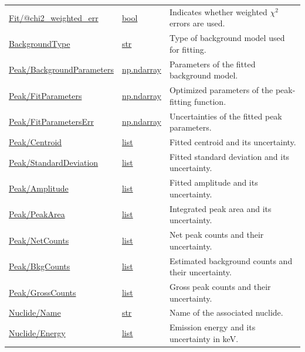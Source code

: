 \begin{table}[H]
\begin{tabular}{p{} p{} p{}}
    \url{Fit/@chi2\_weighted\_err}
        & \url{bool}
        & Indicates whether weighted $\chi^2$ errors are used. \\

    \url{BackgroundType}
        & \url{str}
        & Type of background model used for fitting. \\

    \url{Peak/BackgroundParameters}
        & \url{np.ndarray}
        & Parameters of the fitted background model. \\

    \url{Peak/FitParameters}
        & \url{np.ndarray}
        & Optimized parameters of the peak-fitting function. \\

    \url{Peak/FitParametersErr}
        & \url{np.ndarray}
        & Uncertainties of the fitted peak parameters. \\

    \url{Peak/Centroid}
        & \url{list}
        & Fitted centroid and its uncertainty. \\

    \url{Peak/StandardDeviation}
        & \url{list}
        & Fitted standard deviation and its uncertainty. \\

    \url{Peak/Amplitude}
        & \url{list}
        & Fitted amplitude and its uncertainty. \\

    \url{Peak/PeakArea}
        & \url{list}
        & Integrated peak area and its uncertainty. \\

    \url{Peak/NetCounts}
        & \url{list}
        & Net peak counts and their uncertainty. \\

    \url{Peak/BkgCounts}
        & \url{list}
        & Estimated background counts and their uncertainty. \\

    \url{Peak/GrossCounts}
        & \url{list}
        & Gross peak counts and their uncertainty. \\

    \url{Nuclide/Name}
        & \url{str}
        & Name of the associated nuclide. \\

    \url{Nuclide/Energy}
        & \url{list}
        & Emission energy and its uncertainty in keV. \\


\end{tabular}
\end{table}
